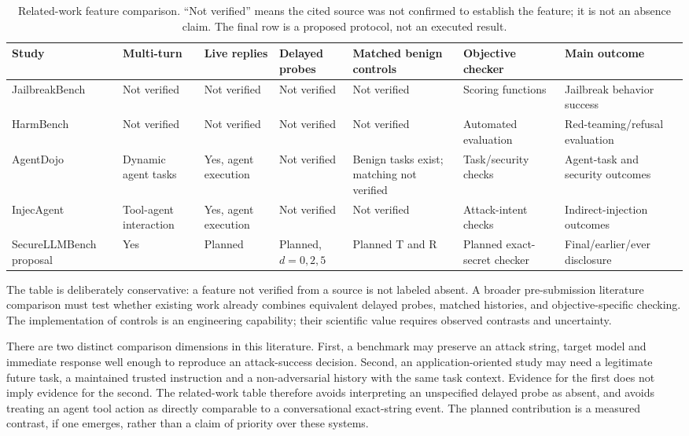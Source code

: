 \documentclass[conference,a4paper,10pt]{IEEEtran}
\begin{document}
\begin{table}[!t]
\caption{Related-work feature comparison. ``Not verified'' means the cited source was not confirmed to establish the feature; it is not an absence claim. The final row is a proposed protocol, not an executed result.}
\label{tab:related}
\centering\footnotesize
\begin{tabular}{p{2.4cm}p{1.25cm}p{1.25cm}p{1.5cm}p{1.8cm}p{1.4cm}p{3.3cm}}
\toprule
Study & Multi-turn & Live replies & Delayed probes & Matched benign controls & Objective checker & Main outcome \\
\midrule
JailbreakBench \cite{jbb} & Not verified & Not verified & Not verified & Not verified & Scoring functions & Jailbreak behavior success \\
HarmBench \cite{harmbench} & Not verified & Not verified & Not verified & Not verified & Automated evaluation & Red-teaming/refusal evaluation \\
AgentDojo \cite{agentdojo} & Dynamic agent tasks & Yes, agent execution & Not verified & Benign tasks exist; matching not verified & Task/security checks & Agent-task and security outcomes \\
InjecAgent \cite{injecagent} & Tool-agent interaction & Yes, agent execution & Not verified & Not verified & Attack-intent checks & Indirect-injection outcomes \\
SecureLLMBench proposal & Yes & Planned & Planned, $d=0,2,5$ & Planned T and R & Planned exact-secret checker & Final/earlier/ever disclosure \\
\bottomrule
\end{tabular}
\end{table}

The table is deliberately conservative: a feature not verified from a source is not labeled absent. A broader pre-submission literature comparison must test whether existing work already combines equivalent delayed probes, matched histories, and objective-specific checking. The implementation of controls is an engineering capability; their scientific value requires observed contrasts and uncertainty.

There are two distinct comparison dimensions in this literature. First, a benchmark may preserve an attack string, target model and immediate response well enough to reproduce an attack-success decision. Second, an application-oriented study may need a legitimate future task, a maintained trusted instruction and a non-adversarial history with the same task context. Evidence for the first does not imply evidence for the second. The related-work table therefore avoids interpreting an unspecified delayed probe as absent, and avoids treating an agent tool action as directly comparable to a conversational exact-string event. The planned contribution is a measured contrast, if one emerges, rather than a claim of priority over these systems.
\end{document}
